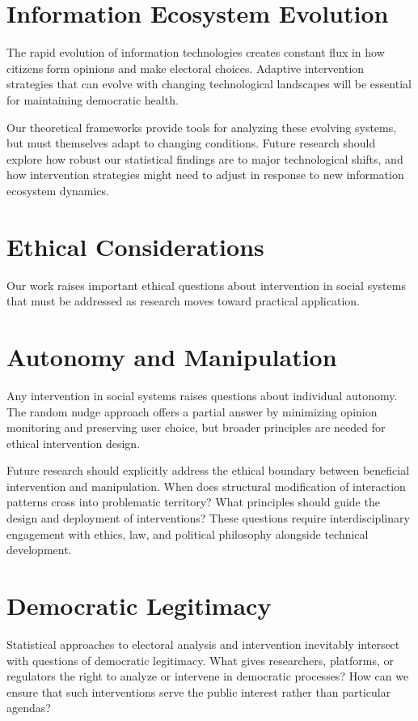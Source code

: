 \section{Information Ecosystem Evolution}

The rapid evolution of information technologies creates constant flux in how citizens form opinions and make electoral choices. Adaptive intervention strategies that can evolve with changing technological landscapes will be essential for maintaining democratic health.

Our theoretical frameworks provide tools for analyzing these evolving systems, but must themselves adapt to changing conditions. Future research should explore how robust our statistical findings are to major technological shifts, and how intervention strategies might need to adjust in response to new information ecosystem dynamics.

\section{Ethical Considerations}

Our work raises important ethical questions about intervention in social systems that must be addressed as research moves toward practical application.

\section{Autonomy and Manipulation}

Any intervention in social systems raises questions about individual autonomy. The random nudge approach offers a partial answer by minimizing opinion monitoring and preserving user choice, but broader principles are needed for ethical intervention design.

Future research should explicitly address the ethical boundary between beneficial intervention and manipulation. When does structural modification of interaction patterns cross into problematic territory? What principles should guide the design and deployment of interventions? These questions require interdisciplinary engagement with ethics, law, and political philosophy alongside technical development.

\section{Democratic Legitimacy}

Statistical approaches to electoral analysis and intervention inevitably intersect with questions of democratic legitimacy. What gives researchers, platforms, or regulators the right to analyze or intervene in democratic processes? How can we ensure that such interventions serve the public interest rather than particular agendas?

